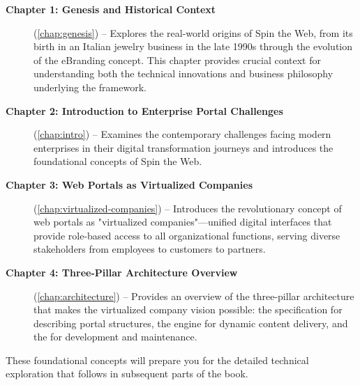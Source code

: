 \begin{description}
\item[\textbf{Chapter 1: Genesis and Historical Context}] (\cref{chap:genesis}) -- Explores the real-world origins of Spin the Web, from its birth in an Italian jewelry business in the late 1990s through the evolution of the eBranding concept. This chapter provides crucial context for understanding both the technical innovations and business philosophy underlying the framework.

\item[\textbf{Chapter 2: Introduction to Enterprise Portal Challenges}] (\cref{chap:intro}) -- Examines the contemporary challenges facing modern enterprises in their digital transformation journeys and introduces the foundational concepts of Spin the Web.

\item[\textbf{Chapter 3: Web Portals as Virtualized Companies}] (\cref{chap:virtualized-companies}) -- Introduces the revolutionary concept of web portals as "virtualized companies"—unified digital interfaces that provide role-based access to all organizational functions, serving diverse stakeholders from employees to customers to partners.

\item[\textbf{Chapter 4: Three-Pillar Architecture Overview}] (\cref{chap:architecture}) -- Provides an overview of the three-pillar architecture that makes the virtualized company vision possible: the \wbdl{} specification for describing portal structures, the \webspinner{} engine for dynamic content delivery, and the \studio{} for development and maintenance.
\end{description}

These foundational concepts will prepare you for the detailed technical exploration that follows in subsequent parts of the book.
